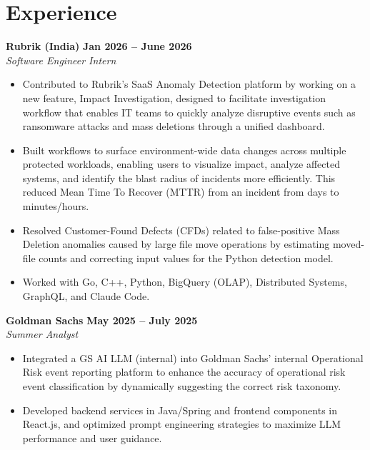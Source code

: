 \documentclass[10pt,a4paper]{article}
\begin{document}
\section*{Experience}
\noindent
\textbf{Rubrik (India)} \hfill \textbf{Jan 2026 -- June 2026} \\
\textit{Software Engineer Intern}
\vspace{-4pt}
\begin{itemize}[leftmargin=*, noitemsep]
    \item Contributed to Rubrik's SaaS Anomaly Detection platform by working on a new feature, Impact Investigation, designed to facilitate investigation workflow that enables IT teams to quickly analyze disruptive events such as ransomware attacks and mass deletions through a unified dashboard.
    \item Built workflows to surface environment-wide data changes across multiple protected workloads, enabling users to visualize impact, analyze affected systems, and identify the blast radius of incidents more efficiently. This reduced Mean Time To Recover (MTTR) from an incident from days to minutes/hours.
    \item Resolved Customer-Found Defects (CFDs) related to false-positive Mass Deletion anomalies caused by large file move operations by estimating moved-file counts and correcting input values for the Python detection model.
    \item Worked with Go, C++, Python, BigQuery (OLAP), Distributed Systems, GraphQL, and Claude Code.
\end{itemize}
\vspace{4pt}

\noindent
\textbf{Goldman Sachs} \hfill \textbf{May 2025 -- July 2025} \\
\textit{Summer Analyst}
\vspace{-4pt}
\begin{itemize}[leftmargin=*, noitemsep]
    \item Integrated a GS AI LLM (internal) into Goldman Sachs' internal Operational Risk event reporting platform to enhance the accuracy of operational risk event classification by dynamically suggesting the correct risk taxonomy.
    \item Developed backend services in Java/Spring and frontend components in React.js, and optimized prompt engineering strategies to maximize LLM performance and user guidance.
\end{itemize}
\vspace{4pt}
\end{document}

